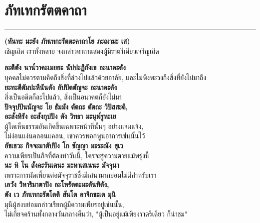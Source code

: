 \documentclass[12pt]{article}
\begin{document}
\section{ภัทเทกรัตตคาถา}
\hrule
\begin{center}
\textbf{(หันทะ มะยัง ภัทเทกะรัตตะคาถาโย ภะณามะ เส)}\\
เชิญเถิด เราทั้งหลาย จงกล่าวคาถาแสดงผู้มีราตรีเดียวเจริญเถิด
\end{center}
\textbf{อะตีตัง นาน๎วาคะเมยยะ นัปปะฏิกังเข อะนาคะตัง}\\
\indent บุคคลไม่ควรตามคิดถึงสิ่งที่ล่วงไปแล้วด้วยอาลัย, และไม่พึงพะวงถึงสิ่งที่ยังไม่มาถึง\\
\textbf{ยะทะตีตัมปะหีนันตัง อัปปัตตัญจะ อะนาคะตัง}\\
\indent สิ่งเป็นอดีตก็ละไปแล้ว, สิ่งเป็นอนาคตก็ยังไม่มา\\
\textbf{ปัจจุปปันนัญจะ โย ธัมมัง ตัตถะ ตัตถะ วิปัสสะติ,\\
อะสังหิรัง อะสังกุปปัง ตัง วิทธา มะนุพ๎รูหะเย}\\
\indent ผู้ใดเห็นธรรมอันเกิดขึ้นเฉพาะหน้าที่นั้นๆ อย่างแจ่มแจ้ง,\\
\indent ไม่ง่อนแง่นคลอนแคลน, เขาควรพอกพูนอาการเช่นนั้นไว้\\
\textbf{อัชเชวะ กิจจะมาตัปปัง โก ชัญญา มะระณัง สุเว}\\
\indent ความเพียรเป็นกิจที่ต้องทำวันนี้, ใครจะรู้ความตายแม้พรุ่งนี้\\
\textbf{นะ หิ โน สังคะรันเตนะ มะหาเสเนนะ มัจจุนา}\\
\indent เพราะการผัดเพี้ยนต่อมัจจุราชซึ่งมีเสนามากย่อมไม่มีสำหรับเรา\\
\textbf{เอวัง วิหาริมาตาปิง อะโหรัตตะมะตันทิตัง,\\
ตัง เว ภัทเทกะรัตโตติ สันโต อาจิกขะเต มุนิ}\\
\indent มุนีผู้สงบย่อมกล่าวเรียกผู้มีความเพียรอยู่เช่นนั้น,\\
\indent ไม่เกียจคร้านทั้งกลางวันกลางคืนว่า, "ผู้เป็นอยู่แม้เพียงราตรีเดียว ก็น่าชม"\\

\pagebreak
\end{document}
